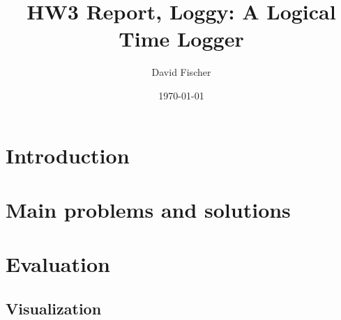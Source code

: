 \documentclass[a4paper, 11pt]{article}
\title{HW3 Report, Loggy: A Logical Time Logger}
\author{David Fischer}
\date{\today{}}
\begin{document}
\maketitle

\section{Introduction}


\section{Main problems and solutions}

\subsection{}


\subsection{}


\subsection{}



\section{Evaluation}

\subsection{Visualization}
\end{document}
